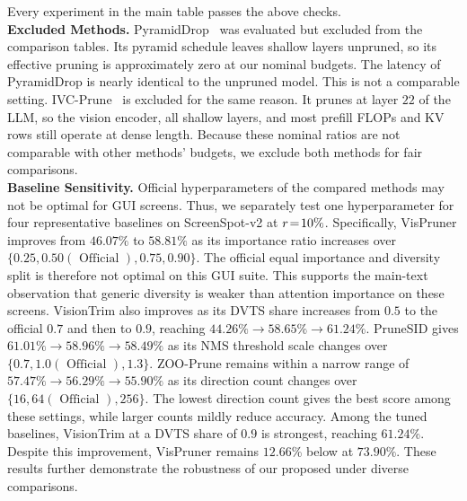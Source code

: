 %
Every experiment in the main table passes the above checks.
\\
\noindent\textbf{Excluded Methods.}
PyramidDrop~\citep{xing2025pdrop} was evaluated but excluded from the comparison tables.
%
Its pyramid schedule leaves shallow layers unpruned, so its effective pruning is approximately zero at our nominal budgets.
%
The latency of PyramidDrop is nearly identical to the unpruned model.
%
This is not a comparable setting.
%
IVC-Prune~\citep{sun2026ivcprune} is excluded for the same reason.
%
It prunes at layer $22$ of the LLM, so the vision encoder, all shallow layers, and most prefill FLOPs and KV rows still operate at dense length.
%
Because these nominal ratios are not comparable with other methods' budgets, we exclude both methods for fair comparisons.
\\
\noindent\textbf{Baseline Sensitivity.}
Official hyperparameters of the compared methods may not be optimal for GUI screens.
%
Thus, we separately test one hyperparameter for four representative baselines on ScreenSpot-v2 at $r\!=\!10\%$.
%
Specifically, VisPruner improves from $46.07\%$ to $58.81\%$ as its importance ratio increases over $\{0.25,0.50 (\text{ Official }),0.75,0.90\}$.
%
The official equal importance and diversity split is therefore not optimal on this GUI suite.
%
This supports the main-text observation that generic diversity is weaker than attention importance on these screens.
%
VisionTrim also improves as its DVTS share increases from $0.5$ to the official $0.7$ and then to $0.9$, reaching $44.26\% \to 58.65\% \to 61.24\%$.
%
PruneSID gives $61.01\% \to 58.96\% \to 58.49\%$ as its NMS threshold scale changes over $\{0.7,1.0 ( \text{ Official }),1.3\}$.
%
ZOO-Prune remains within a narrow range of $57.47\% \to 56.29\% \to 55.90\%$ as its direction count changes over $\{16,64 (\text{ Official }),256\}$.
%
The lowest direction count gives the best score among these settings, while larger counts mildly reduce accuracy.
%
Among the tuned baselines, VisionTrim at a DVTS share of $0.9$ is strongest, reaching $61.24\%$.
%
Despite this improvement, VisPruner remains $12.66$\% below \method{} at $73.90\%$.
%
These results further demonstrate the robustness of our proposed \method{} under diverse comparisons.
